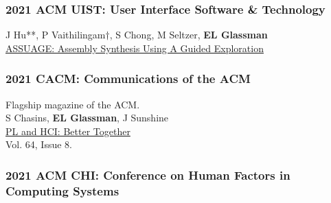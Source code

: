 \documentclass[10pt, a4paper]{article}
\newcommand{\years}[1]{\marginnote{\normalsize #1}}
\begin{document}
\subsubsection*{2021 ACM \textbf{UIST}: User Interface Software \& Technology}

\years{\textbf{C21}}J Hu**, P Vaithilingam$\dagger$, S Chong, M Seltzer, \textbf{EL Glassman}\\
\href{http://glassmanlab.seas.harvard.edu/papers/ASSUAGE_UIST21.pdf}{ASSUAGE: Assembly Synthesis Using A Guided Exploration}

\subsubsection*{2021 \textbf{CACM}: Communications of the ACM}
Flagship magazine of the ACM.\\%

\years{\textbf{M1}}S Chasins, \textbf{EL Glassman}, J Sunshine\\
\href{http://glassmanlab.seas.harvard.edu/papers/PLandHCI_betterTogether.pdf}{PL and HCI: Better Together}\\
Vol. 64, Issue 8.

\subsubsection*{2021 ACM \textbf{CHI}: Conference on Human Factors in Computing Systems}
\end{document}
